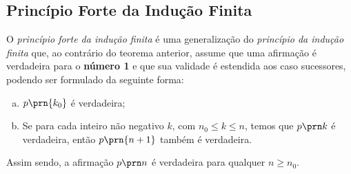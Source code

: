 \subsection{Princípio Forte da Indução Finita}

O \emph{princípio forte da indução finita } é uma generalização do \emph{princípio da indução finita} que, ao contrário do teorema anterior, assume que uma afirmação é verdadeira para o \textbf{número 1} e que sua validade é estendida aos caso sucessores, podendo ser formulado da seguinte forma:

\begin{enumerate}[(a)]
    \item $p \prn{k_0}$ é verdadeira;
    \item Se para cada inteiro não negativo $k$, com $n_0 \le k \le n$, temos que $p \prn k$ é verdadeira, então $p \prn {n+1}$ também é verdadeira.
\end{enumerate}
  
Assim sendo, a afirmação $p \prn n$ é verdadeira para qualquer $n \ge n_0$.
